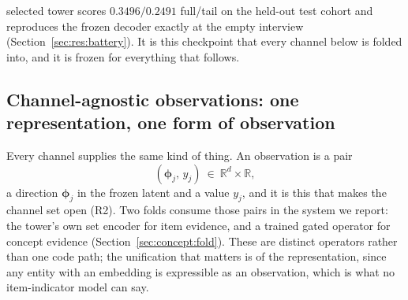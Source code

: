 \documentclass[manuscript,screen]{acmart}
\newcommand{\R}{\mathbb{R}}
\newcommand{\bphi}{\boldsymbol{\phi}}
\begin{document}
selected tower scores $0.3496/0.2491$ full/tail on the held-out test cohort and reproduces the frozen decoder exactly at the empty interview (Section~\ref{sec:res:battery}). It is this checkpoint that every channel below is folded into, and it is frozen for everything that follows.

\subsection{Channel-agnostic observations: one representation, one form of observation}
Every channel supplies the same kind of thing. An observation is a pair
\begin{equation}\label{eq:obs}
  (\bphi_j,\,y_j)\ \in\ \R^{d}\times\R,
\end{equation}
a direction $\bphi_j$ in the frozen latent and a value $y_j$, and it is this that makes the channel set open (R2). Two folds consume those pairs in the system we report: the tower's own set encoder for item evidence, and a trained gated operator for concept evidence (Section~\ref{sec:concept:fold}). These are distinct operators rather than one code path; the unification that matters is of the representation, since any entity with an embedding is expressible as an observation, which is what no item-indicator model can say.
\end{document}
